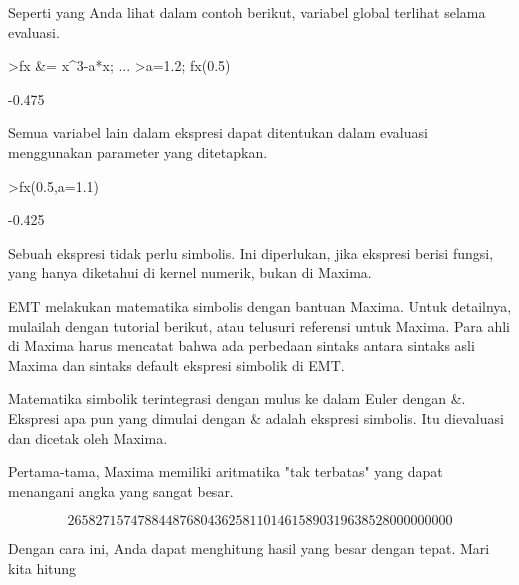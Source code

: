 \documentclass[a4paper,10pt]{article}
\begin{document}
\begin{eulernotebook}
\begin{eulercomment}
Seperti yang Anda lihat dalam contoh berikut, variabel global terlihat
selama evaluasi.
\end{eulercomment}
\begin{eulerprompt}
>fx &= x^3-a*x;  ...
>a=1.2; fx(0.5)
\end{eulerprompt}
\begin{euleroutput}
  -0.475
\end{euleroutput}
\begin{eulercomment}
Semua variabel lain dalam ekspresi dapat ditentukan dalam evaluasi
menggunakan parameter yang ditetapkan.
\end{eulercomment}
\begin{eulerprompt}
>fx(0.5,a=1.1)
\end{eulerprompt}
\begin{euleroutput}
  -0.425
\end{euleroutput}
\begin{eulercomment}
Sebuah ekspresi tidak perlu simbolis. Ini diperlukan, jika ekspresi
berisi fungsi, yang hanya diketahui di kernel numerik, bukan di
Maxima.

\begin{eulercomment}
\begin{eulercomment}
EMT melakukan matematika simbolis dengan bantuan Maxima. Untuk
detailnya, mulailah dengan tutorial berikut, atau telusuri referensi
untuk Maxima. Para ahli di Maxima harus mencatat bahwa ada perbedaan
sintaks antara sintaks asli Maxima dan sintaks default ekspresi
simbolik di EMT.

Matematika simbolik terintegrasi dengan mulus ke dalam Euler dengan \&.
Ekspresi apa pun yang dimulai dengan \& adalah ekspresi simbolis. Itu
dievaluasi dan dicetak oleh Maxima.

Pertama-tama, Maxima memiliki aritmatika "tak terbatas" yang dapat
menangani angka yang sangat besar.
\end{eulercomment}
\begin{eulerformula}
\[
2658271574788448768043625811014615890319638528000000000
\]
\end{eulerformula}
\begin{eulercomment}
Dengan cara ini, Anda dapat menghitung hasil yang besar dengan tepat.
Mari kita hitung


\end{eulercomment}
\end{eulercomment}
\end{eulercomment}
\end{eulernotebook}
\end{document}
